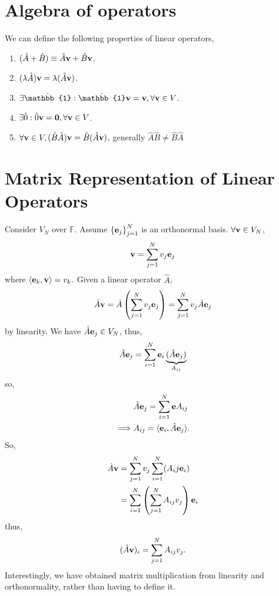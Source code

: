 \documentclass{book}
\def\innerproduct#1#2{{\langle #1},{#2 \rangle}}
\begin{document}
\section{Algebra of operators}
We can define the following properties of linear operators,
\begin{enumerate}
	\item $(\hat{A} + \hat{B}) \equiv \hat{A}\vb{v} + \hat{B} \vb{v}$.
	\item $(\lambda\hat{A})\vb{v} = \lambda(\hat{A}\vb{v})$.
	\item $\exists\hat{\mathbb{1}} : \hat{\mathbb{1}}\vb{v} = \vb{v}, \forall \vb{v} \in V$.
	\item $\exists \hat{0} : \hat{0}\vb{v} = \vb{0}, \forall \vb{v} \in V$.
	\item $\forall \vb{v} \in V, (\hat{B}\hat{A})\vb{v} = \hat{B}(\hat{A}\vb{v})$, generally $\hat{A} \hat{B} \neq \hat{B}\hat{A}$
\end{enumerate}
\section{Matrix Representation of Linear Operators}
Consider $V_N$ over $\mathbb{F}$. Assume $\left\{\vb{e}_j\right\}_{j=1}^N$ is an orthonormal basis. $\forall \vb{v} \in V_N$,
\begin{equation}
	\vb{v} = \sum_{j=1}^Nv_j \vb{e}_j
\end{equation}
where $\innerproduct{\vb{e}_k}{\vb{v}} = v_k$. Given a linear operator $\hat{A}$,
\begin{equation}
	\hat{A} \vb{v} = \hat{A} \left(\sum_{j=1}^N v_j\vb{e}_j\right) = \sum_{j=1}^Nv_j\hat{A}\vb{e}_j
\end{equation}
by linearity. We have $\hat{A}\vb{e}_j \in V_N$, thus,
\begin{equation}
	\hat{A} \vb{e}_j = \sum_{i=1}^N\vb{e}_i\underbrace{(\hat{A}\vb{e}_j)}_{A_{ij}}
\end{equation}
so,
\begin{equation}
	\begin{split}
		& \hat{A}\vb{e}_j = \sum_{i=1}^N\vb{e}A_{ij} \\
		\implies & A_{ij} = \innerproduct{\vb{e}_i}{\hat{A}\vb{e}_j}.
	\end{split}
\end{equation}
So,
\begin{equation}
	\begin{split}
		\hat{A}\vb{v} & = \sum_{j=1}^Nv_j\sum_{i=1}^N(A_ij\vb{e}_i) \\
		& =\sum_{i=1}^{N}\left(\sum_{j=1}^NA_{ij}v_j\right)\vb{e}_i
	\end{split}
\end{equation}
thus,
\begin{equation}
	(\hat{A}\vb{v})_i = \sum_{j=1}^N A_{ij}v_j.
\end{equation}
Interestingly, we have obtained matrix multiplication from linearity and orthonormality, rather than having to define it.
\end{document}
